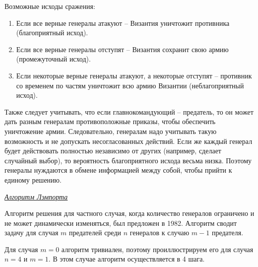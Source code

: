 Возможные исходы сражения:
\begin{enumerate}
\item Если все верные генералы атакуют -- Византия уничтожит противника (благоприятный исход).
\item Если все верные генералы отступят -- Византия сохранит свою армию (промежуточный исход).
\item Если некоторые верные генералы атакуют, а некоторые отступят -- противник со временем по частям уничтожит всю армию Византии (неблагоприятный исход).
\end{enumerate}
   
Также следует учитывать, что если главнокомандующий -- предатель, то он может дать разным генералам противоположные приказы, чтобы обеспечить уничтожение армии. Следовательно, генералам надо учитывать такую возможность и не допускать несогласованных действий. Если же каждый генерал будет действовать полностью независимо от других (например, сделает случайный выбор), то вероятность благоприятного исхода весьма низка. Поэтому генералы нуждаются в обмене информацией между собой, чтобы прийти к единому решению. 


\begin{center}
    \hypertarget{Byzantine_fault} {\textit{\underline{Алгоритм Лэмпорта}}}
\end{center}

Алгоритм решения для частного случая, когда количество генералов ограничено и не может динамически изменяться, был предложен в 1982. Алгоритм сводит задачу для случая $m$ предателей среди $n$ генералов к случаю $m-1$ предателя.

Для случая $m=0$ алгоритм тривиален, поэтому проиллюстрируем его для случая $n=4$ и $m=1$. В этом случае алгоритм осуществляется в 4 шага.

